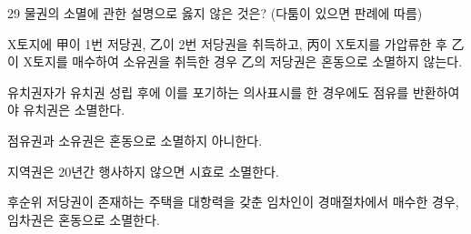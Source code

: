 \begin{question}{29}
물권의 소멸에 관한 설명으로 옳지 않은 것은? (다툼이 있으면 판례에 따름)
\begin{choices}
  \item X토지에 甲이 1번 저당권, 乙이 2번 저당권을 취득하고, 丙이 X토지를 가압류한 후 乙이 X토지를 매수하여 소유권을 취득한 경우 乙의 저당권은 혼동으로 소멸하지 않는다.
  \item 유치권자가 유치권 성립 후에 이를 포기하는 의사표시를 한 경우에도 점유를 반환하여야 유치권은 소멸한다.
  \item 점유권과 소유권은 혼동으로 소멸하지 아니한다.
  \item 지역권은 20년간 행사하지 않으면 시효로 소멸한다.
  \item 후순위 저당권이 존재하는 주택을 대항력을 갖춘 임차인이 경매절차에서 매수한 경우, 임차권은 혼동으로 소멸한다.
\end{choices}
\end{question}
